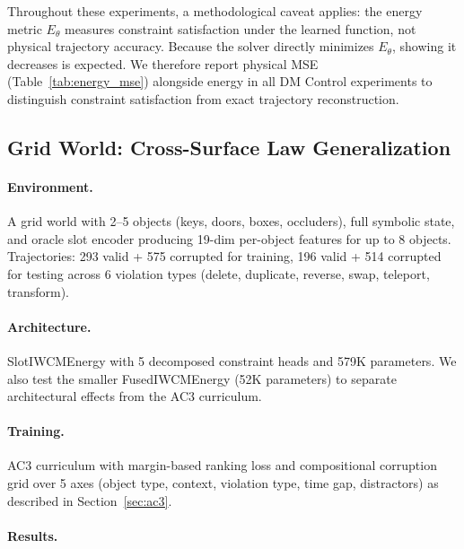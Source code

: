 \documentclass[12pt]{article}
\begin{document}
Throughout these experiments, a methodological caveat applies: the energy metric $E_\theta$ measures constraint satisfaction under the learned function, not physical trajectory accuracy. Because the solver directly minimizes $E_\theta$, showing it decreases is expected. We therefore report physical MSE (Table~\ref{tab:energy_mse}) alongside energy in all DM Control experiments to distinguish constraint satisfaction from exact trajectory reconstruction.

\subsection{Grid World: Cross-Surface Law Generalization}
\label{sec:exp_grid}

\paragraph{Environment.} A grid world with 2--5 objects (keys, doors, boxes, occluders), full symbolic state, and oracle slot encoder producing 19-dim per-object features for up to 8 objects. Trajectories: 293 valid + 575 corrupted for training, 196 valid + 514 corrupted for testing across 6 violation types (delete, duplicate, reverse, swap, teleport, transform).

\paragraph{Architecture.} SlotIWCMEnergy with 5 decomposed constraint heads and 579K parameters. We also test the smaller FusedIWCMEnergy (52K parameters) to separate architectural effects from the AC3 curriculum.

\paragraph{Training.} AC3 curriculum with margin-based ranking loss and compositional corruption grid over 5 axes (object type, context, violation type, time gap, distractors) as described in Section~\ref{sec:ac3}.

\paragraph{Results.}
\end{document}
